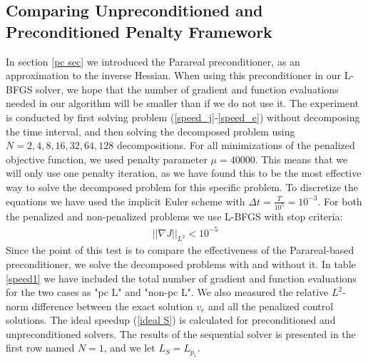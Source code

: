 \subsection{Comparing Unpreconditioned and Preconditioned Penalty Framework}
In section \ref{pc sec} we introduced the Parareal preconditioner, as an approximation to the inverse Hessian. When using this preconditioner in our L-BFGS solver, we hope that the number of gradient and function evaluations needed in our algorithm will be smaller than if we do not use it. The experiment is conducted by first solving problem (\ref{speed_j}-\ref{speed_e}) without decomposing the time interval, and then solving the decomposed problem using $N=2,4,8,16,32,64,128$ decompositions. For all minimizations of the penalized objective function, we used penalty parameter $\mu=40000$. This means that we will only use one penalty iteration, as we have found this to be the most effective way to solve the decomposed problem for this specific problem. To discretize the equations we have used the implicit Euler scheme with $\Delta t= \frac{T}{10^5}=10^{-3}$. For both the penalized and non-penalized problems we use L-BFGS with stop criteria:
\begin{align*}
||\nabla J||_{L^2} <10^{-5}
\end{align*}  
Since the point of this test is to compare the effectiveness of the Parareal-based preconditioner, we solve the decomposed problems with and without it. In table \ref{speed1} we have included the total number of gradient and function evaluations for the two cases as "pc L" and "non-pc L". We also measured the relative $L^2$-norm difference between the exact solution $v_e$ and all the penalized control solutions. The ideal speedup (\ref{ideal S}) is calculated for preconditioned and unpreconditioned solvers. The results of the sequential solver is presented in the first row named $N=1$, and we let $L_S=L_{p_1}$.
\\
